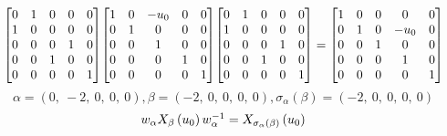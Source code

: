 \documentclass[11pt]{article}
\theoremstyle{definition}
\begin{document}
\[
\scaletoalign{\textwidth}{{\left[\begin{matrix}0 & 1 & 0 & 0 & 0\\1 & 0 & 0 & 0 & 0\\0 & 0 & 0 & 1 & 0\\0 & 0 & 1 & 0 & 0\\0 & 0 & 0 & 0 & 1\end{matrix}\right]} {\left[\begin{matrix}1 & 0 & - u_{0} & 0 & 0\\0 & 1 & 0 & 0 & 0\\0 & 0 & 1 & 0 & 0\\0 & 0 & 0 & 1 & 0\\0 & 0 & 0 & 0 & 1\end{matrix}\right]} {\left[\begin{matrix}0 & 1 & 0 & 0 & 0\\1 & 0 & 0 & 0 & 0\\0 & 0 & 0 & 1 & 0\\0 & 0 & 1 & 0 & 0\\0 & 0 & 0 & 0 & 1\end{matrix}\right]} = {\left[\begin{matrix}1 & 0 & 0 & 0 & 0\\0 & 1 & 0 & - u_{0} & 0\\0 & 0 & 1 & 0 & 0\\0 & 0 & 0 & 1 & 0\\0 & 0 & 0 & 0 & 1\end{matrix}\right]}}
\]
\[
\alpha = \left( 0, \  -2, \  0, \  0, \  0\right), \beta = \left( -2, \  0, \  0, \  0, \  0\right), \sigma_{\alpha}(\beta) = \left( -2, \  0, \  0, \  0, \  0\right)
\]
\[
\scaletoalign{\textwidth}{w_{\alpha} X_{\beta}\left(u_{0}\right) w_{\alpha}^{-1} = X_{\sigma_{\alpha}\left(\beta\right)}\left(u_{0}\right)}
\]
\end{document}
